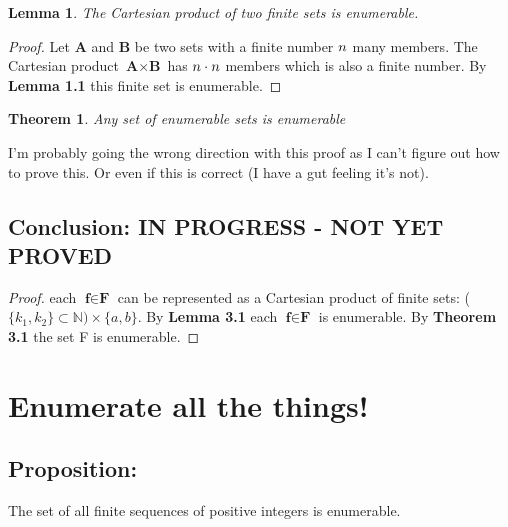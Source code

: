 \documentclass[a4paper,11pt]{article}
\newtheorem{lem}{Lemma}[section]
\newtheorem{thm}{Theorem}[section]
\begin{document}
	\bigskip
	
	\begin{lem} The Cartesian product of two finite sets is enumerable. \end{lem}
	\begin{proof}
	Let \textbf{A} and \textbf{B} be two sets with a finite number $\mathnormal{n}$ many members.
	The Cartesian product $\textbf{A} \times \textbf{B}$ has $\mathnormal{n} \cdot \mathnormal{n}$ members
	which is also a finite number. By \textbf{Lemma 1.1} this finite set is enumerable.
	\end{proof}
	
	\bigskip
	
	\begin{thm} Any set of enumerable sets is enumerable \end{thm}
	I'm probably going the wrong direction with this proof as I can't figure out how to prove this. Or even
	if this is correct (I have a gut feeling it's not).

	\subsection*{Conclusion: IN PROGRESS - NOT YET PROVED}
	\begin{proof}
	each $\textbf{f} \in \textbf{F}$ can be represented as a Cartesian product of finite sets:
	($\{k_{1}, k_{2}\} \subset \mathbb{N}) \times \{a, b\}$. By \textbf{Lemma 3.1} each $\textbf{f} \in \textbf{F}$ is 
	enumerable. By \textbf{Theorem 3.1} the set F is enumerable.
	\end{proof}
	
\pagebreak


\section{Enumerate all the things!}

	\subsection*{Proposition:}
	The set of all finite sequences of positive integers is enumerable.
	
	\bigskip
	
\end{document}
